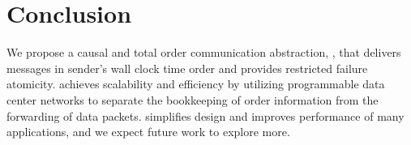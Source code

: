\section{Conclusion}
\label{sec:conclusion}

We propose a causal and total order communication abstraction, \sys{}, that delivers messages in sender's wall clock time order and provides restricted failure atomicity. 
\sys{} achieves scalability and efficiency by utilizing programmable data center networks to separate the bookkeeping of order information from the forwarding of data packets.
\sys{} simplifies design and improves performance of many applications, and we expect future work to explore more. %
